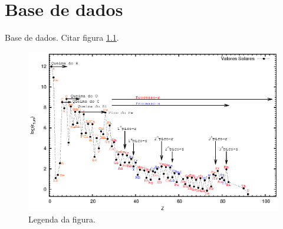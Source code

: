 \chapter{Base de dados}\label{database}

Base de dados. Citar figura \ref{identificador}.

\begin{figure}[!ht]
\begin{center}
\setcaptionmargin{1cm}
\includegraphics[width=1.0 \columnwidth,angle=0]{fig/solar_grevesse.eps}
\caption[Resumo da legenda da figura (aparece na lista de figuras)]{Legenda da figura.} 
\label{identificador}
\end{center}
\end{figure}



